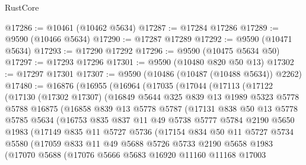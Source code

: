 \begin{lexlean}{RustCore}
\begin{coremodule}
@17286 := @10461 (@10462 @5634)
@17287 := @17284 @17286
@17289 := @9590 (@10466 @5634)
@17290 := @17287 @17289
@17292 := @9590 (@10471 @5634)
@17293 := @17290 @17292
@17296 := @9590 (@10475 @5634 @50)
@17297 := @17293 @17296
@17301 := @9590 (@10480 @820 @50 @13)
@17302 := @17297 @17301
@17307 := @9590 (@10486 (@10487 (@10488 @5634)) @2262)
@17480 := @16876
    (@16955
      (@16964
        (@17035
          (@17044
            (@17113
              (@17122
                (@17130
                  (@17302 @17307)
                  (@16849
                    @5644
                    @325
                    @839
                    @13
                    @1989
                    @5323
                    @5778
                    @5788
                    @16875
                    (@16858
                      @839
                      @13
                      @5778
                      @5787
                      (@17131
                        @838
                        @50
                        @13
                        @5778
                        @5785
                        @5634
                        (@16753
                          @835
                          @837
                          @11
                          @49
                          @5738
                          @5777
                          @5784
                          @2190
                          @5650
                          @1983
                          (@17149
                            @835
                            @11
                            @5727
                            @5736
                            (@17154
                              @834
                              @50
                              @11
                              @5727
                              @5734
                              @5580
                              (@17059
                                @833
                                @11
                                @49
                                @5688
                                @5726
                                @5733
                                @2190
                                @5658
                                @1983
                                (@17070
                                  @5688
                                  (@17076
                                    @5666
                                    @5683
                                    @16920
                                    @11160
                                    @11168
                                    @17003

\end{coremodule}
\end{lexlean}
